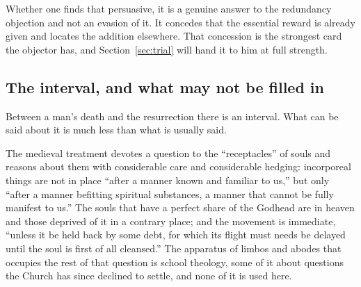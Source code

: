 Whether one finds that persuasive, it is a genuine answer to the redundancy objection and not an evasion of it. It concedes that the essential reward is already given and locates the addition elsewhere. That concession is the strongest card the objector has, and Section~\ref{sec:trial} will hand it to him at full strength.

\subsection{The interval, and what may not be filled in}

Between a man's death and the resurrection there is an interval. What can be said about it is much less than what is usually said.

The medieval treatment devotes a question to the ``receptacles'' of souls and reasons about them with considerable care and considerable hedging: incorporeal things are not in place ``after a manner known and familiar to us,'' but only ``after a manner befitting spiritual substances, a manner that cannot be fully manifest to us.'' The souls that have a perfect share of the Godhead are in heaven and those deprived of it in a contrary place; and the movement is immediate, ``unless it be held back by some debt, for which its flight must needs be delayed until the soul is first of all cleansed.'' The apparatus of limbos and abodes that occupies the rest of that question is school theology, some of it about questions the Church has since declined to settle, and none of it is used here.


